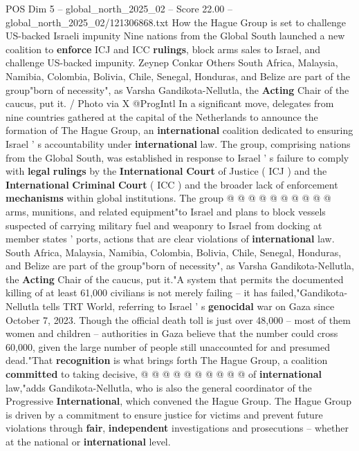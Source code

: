 \begin{textsample}{POS Dim 5 – global\_north\_2025\_02 – Score 22.00 – global\_north\_2025\_02/121306868.txt}  \label{ex:f5_pos_201}
How the Hague Group is set to challenge US-backed Israeli impunity Nine nations from the Global South launched a new coalition to \textbf{enforce} ICJ and ICC \textbf{rulings}, block arms sales to Israel, and challenge US-backed impunity.
Zeynep Conkar Others South Africa, Malaysia, Namibia, Colombia, Bolivia, Chile, Senegal, Honduras, and Belize are part of the group"born of necessity", as Varsha Gandikota-Nellutla, the \textbf{Acting} Chair of the caucus, put it. / Photo via X @ProgIntl In a significant move, delegates from nine countries gathered at the capital of the Netherlands to announce the formation of The Hague Group, an \textbf{international} coalition dedicated to ensuring Israel ' s accountability under \textbf{international} law.
The group, comprising nations from the Global South, was established in response to Israel ' s failure to comply with \textbf{legal} \textbf{rulings} by the \textbf{International} \textbf{Court} of Justice ( ICJ ) and the \textbf{International} \textbf{Criminal} \textbf{Court} ( ICC ) and the broader lack of enforcement \textbf{mechanisms} within global institutions.
The group @ @ @ @ @ @ @ @ @ @ arms, munitions, and related equipment"to Israel and plans to block vessels suspected of carrying military fuel and weaponry to Israel from docking at member states ' ports, actions that are clear violations of \textbf{international} law.
South Africa, Malaysia, Namibia, Colombia, Bolivia, Chile, Senegal, Honduras, and Belize are part of the group"born of necessity", as Varsha Gandikota-Nellutla, the \textbf{Acting} Chair of the caucus, put it."A system that permits the documented killing of at least 61,000 civilians is not merely failing -- it has failed,"Gandikota-Nellutla tells TRT World, referring to Israel ' s \textbf{genocidal} war on Gaza since October 7, 2023.
Though the official death toll is just over 48,000 -- most of them women and children -- authorities in Gaza believe that the number could cross 60,000, given the large number of people still unaccounted for and presumed dead."That \textbf{recognition} is what brings forth The Hague Group, a coalition \textbf{committed} to taking decisive, @ @ @ @ @ @ @ @ @ @ of \textbf{international} law,"adds Gandikota-Nellutla, who is also the general coordinator of the Progressive \textbf{International}, which convened the Hague Group.
The Hague Group is driven by a commitment to ensure justice for victims and prevent future violations through \textbf{fair}, \textbf{independent} investigations and prosecutions -- whether at the national or \textbf{international} level.

\end{textsample}
